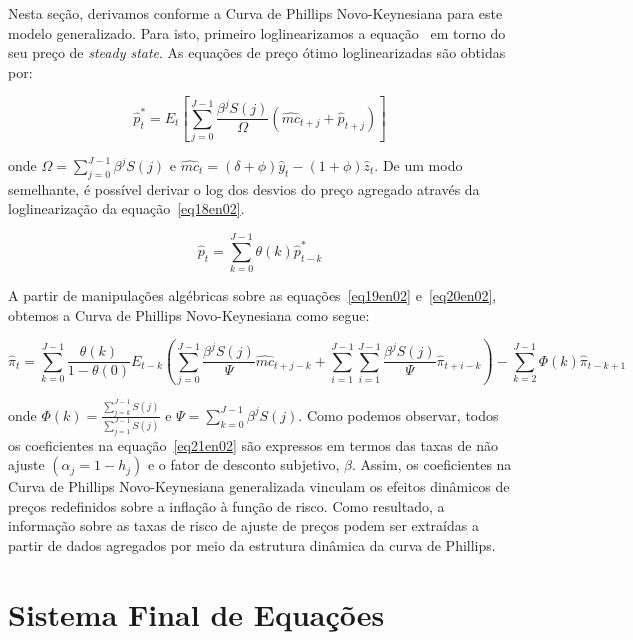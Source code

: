 \documentclass[twoside,a4paper,11pt]{report}
\begin{document}
{{Nesta seção, derivamos conforme \citet{yao2010aggregate} a Curva de Phillips Novo-Keynesiana para este modelo generalizado. Para isto, primeiro loglinearizamos a equação~\label{eq17en02} em torno do seu preço de \emph{steady state}. As equações de preço ótimo loglinearizadas são obtidas por:

\begin{equation}\label{eq19en02}
{\hat{p}}_{t}^{*}={E}_{t}[\sum_{j=0}^{J-1}{\frac{{\beta}^{j}S(j)}{\Omega}}({\hat{mc}}_{t+j}+{\hat{p}}_{t+j})] 
\end{equation}

\noindent onde $\Omega=\sum_{j=0}^{J-1}{{\beta}^{j}S(j)}$ e ${\hat{mc}}_{t}=(\delta +\phi){\hat{y}}_{t}-(1+\phi){\hat{z}}_{t}$. De um modo semelhante, é possível derivar o log dos desvios do preço agregado através da loglinearização da equação~\ref{eq18en02}.

\begin{equation}\label{eq20en02}
{\hat{p}}_{t}=\sum_{k=0}^{J-1}{\theta(k){\hat{p}}_{t-k}^{*}} 
\end{equation}

A partir de manipulações algébricas sobre as equações~\ref{eq19en02} e~\ref{eq20en02}, obtemos a Curva de Phillips Novo-Keynesiana como segue:

\begin{equation}\label{eq21en02}
{\hat{\pi}}_{t}=\sum_{k=0}^{J-1}{\frac{\theta(k)}{1-\theta(0)}{E}_{t-k}(\sum_{j=0}^{J-1}{\frac{{\beta}^{j}S(j)}{\Psi}{\hat{mc}}_{t+j-k}+\sum_{i=1}^{J-1}{\sum_{i=1}^{J-1}{\frac{{\beta}^{j}S(j)}{\Psi}}}{\hat{\pi}}_{t+i-k}})-\sum_{k=2}^{J-1}{\Phi(k){\hat{\pi}}_{t-k+1}}} 
\end{equation}

\noindent onde $\Phi(k)=\frac{\sum _{j=k}^{J-1}{S(j)}}{\sum _{j=1}^{J-1}{S(j)}}$ e $\Psi =\sum _{k=0}^{J-1}{{\beta}^{j}S(j)}$. Como podemos observar, todos os coeficientes na equação~\ref{eq21en02} são expressos em termos das taxas de não ajuste $({\alpha}_{j}=1-{h}_{j})$ e o fator de desconto subjetivo, $\beta$. Assim, os coeficientes na Curva de Phillips Novo-Keynesiana generalizada vinculam os efeitos dinâmicos de preços redefinidos sobre a inflação à função de risco. Como resultado, a informação sobre as taxas de risco de ajuste de preços podem ser extraídas a partir de dados agregados por meio da estrutura dinâmica da curva de Phillips.


\section*{Sistema Final de Equações}

}}
\end{document}
